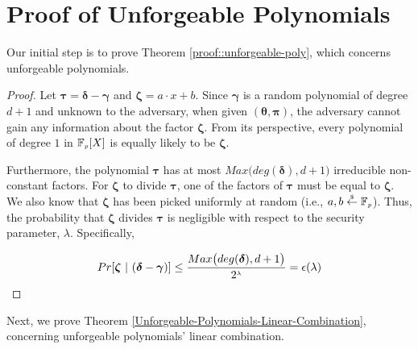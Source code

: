 


\section{Proof of Unforgeable Polynomials}\label{sec::proof-of-unforgeable-polys}




Our initial step is to prove Theorem \ref{proof::unforgeable-poly}, which concerns unforgeable polynomials.  


\begin{proof}

Let $\bm\tau=\bm\delta-\bm\gamma$ and $\bm\zeta=a\cdot x+b$. Since $\bm\gamma$ is a random polynomial of degree $d+1$ and unknown to the adversary, when given $(\bm\theta, \bm\pi)$,  the adversary cannot gain any information about the factor $\bm\zeta$.  From its perspective, every polynomial of degree $1$ in $\mathbb{F}_{\scriptscriptstyle p}[X]$ is equally likely to be $\bm\zeta$. 

Furthermore,  the polynomial $\bm\tau$ has at most $Max\big(deg(\bm\delta), d+1\big)$ irreducible non-constant factors.  For $\bm\zeta $ to divide $\bm\tau$,  one of the factors of $\bm\tau$ must be equal to $\bm\zeta$. We  also know that $\bm\zeta$ has been picked uniformly at random (i.e., $a,b
\stackrel{\scriptscriptstyle \$}\leftarrow \mathbb F_{\scriptscriptstyle p}$). Thus, the probability that $\bm\zeta $ divides $\bm\tau$ is negligible with respect to the security parameter, $\lambda$. Specifically,

$$Pr[ \bm\zeta \ | \ (\bm\delta-\bm\gamma)]\leq \frac{Max\big(deg(\bm\delta), d+1\big)} {2^{\st \lambda}}=\negl(\lambda)$$
\end{proof} 



 
 

 
Next, we prove Theorem \ref{Unforgeable-Polynomials-Linear-Combination}, concerning unforgeable polynomials' linear combination.  
 
